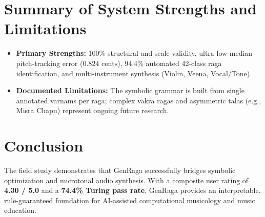 \documentclass[11pt,a4paper]{article}
\begin{document}
\section{Summary of System Strengths and Limitations}

\begin{itemize}
    \item \textbf{Primary Strengths:} 100\% structural and scale validity, ultra-low median pitch-tracking error ($0.824\text{ cents}$), 94.4\% automated 42-class raga identification, and multi-instrument synthesis (Violin, Veena, Vocal/Tone).
    \item \textbf{Documented Limitations:} The symbolic grammar is built from single annotated varnams per raga; complex vakra ragas and asymmetric talas (e.g., Misra Chapu) represent ongoing future research.
\end{itemize}

\section{Conclusion}
The field study demonstrates that GenRaga successfully bridges symbolic optimization and microtonal audio synthesis. With a composite user rating of \textbf{4.30 / 5.0} and a \textbf{74.4\% Turing pass rate}, GenRaga provides an interpretable, rule-guaranteed foundation for AI-assisted computational musicology and music education.
\end{document}

